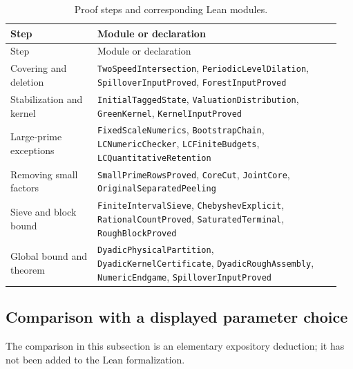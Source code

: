 \documentclass[11pt,a4paper]{article}
\begin{document}
\begingroup\small
\begin{longtable}{@{}>{\raggedright\arraybackslash}p{0.25\linewidth}
                       >{\raggedright\arraybackslash}p{0.70\linewidth}@{}}
\caption{Proof steps and corresponding Lean modules.}\label{tab:lean}\\
\toprule
Step & Module or declaration\\
\midrule
\endfirsthead
\toprule
Step & Module or declaration\\
\midrule
\endhead
\bottomrule
\endfoot
Covering and deletion &
\texttt{TwoSpeedIntersection}, \texttt{PeriodicLevelDilation},
\texttt{SpilloverInputProved}, \texttt{ForestInputProved}\\
Stabilization and kernel &
\texttt{InitialTaggedState}, \texttt{ValuationDistribution},
\texttt{GreenKernel}, \texttt{KernelInputProved}\\
Large-prime exceptions &
\texttt{FixedScaleNumerics}, \texttt{BootstrapChain},
\texttt{LCNumericChecker}, \texttt{LCFiniteBudgets},
\texttt{LCQuantitativeRetention}\\
Removing small factors &
\texttt{SmallPrimeRowsProved}, \texttt{CoreCut},
\texttt{JointCore}, \texttt{OriginalSeparatedPeeling}\\
Sieve and block bound &
\texttt{FiniteIntervalSieve}, \texttt{ChebyshevExplicit},
\texttt{RationalCountProved}, \texttt{SaturatedTerminal}, \texttt{RoughBlockProved}\\
Global bound and theorem &
\texttt{DyadicPhysicalPartition}, \texttt{DyadicKernelCertificate},
\texttt{DyadicRoughAssembly}, \texttt{NumericEndgame},
\texttt{SpilloverInputProved}\\
\end{longtable}
\endgroup
\subsection{Comparison with a displayed parameter choice}
\label{sec:parameter-comparison}

The comparison in this subsection is an elementary expository deduction;
it has not been added to the Lean formalization.
\end{document}
